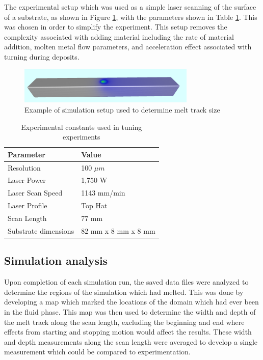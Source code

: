 \documentclass[pdflatex,sn-mathphys]{sn-jnl}
\begin{document}
	The experimental setup which was used as a simple laser scanning of the surface of a substrate, as shown in Figure \ref{fig:melt_validation_example}, with the parameters shown in Table \ref{tab:exp_constants}.  This was chosen in order to simplify the experiment.  This setup removes the complexity associated with adding material including the rate of material addition, molten metal flow parameters, and acceleration effect associated with turning during deposits.
	\begin{figure}[!htb]
		\centering
		\includegraphics[width=0.75\textwidth]{melt_validation_example}
		\caption{Example of simulation setup used to determine melt track size}
		\label{fig:melt_validation_example}
	\end{figure}
	\begin{table}[!htb]
		\centering
		\caption{Experimental constants used in tuning experiments}
		\label{tab:exp_constants}
		\begin{tabular}{|l|l|} \hline
			Parameter & Value \\ \hline
			Resolution & 100 $\mu m$ \\ \hline
			Laser Power & 1,750 W \\ \hline
			Laser Scan Speed & 1143 mm/min \\ \hline
			Laser Profile & Top Hat \\ \hline
			Scan Length & 77 mm \\ \hline
			Substrate dimensions & 82 mm x 8 mm x 8 mm \\ \hline
		\end{tabular}
	\end{table}
	
	
	\subsection{Simulation analysis} \label{sim_analysis}

	Upon completion of each simulation run, the saved data files were analyzed to determine the regions of the simulation which had melted.  This was done by developing a map which marked the locations of the domain which had ever been in the fluid phase.  This map was then used to determine the width and depth of the melt track along the scan length, excluding the beginning and end where effects from starting and stopping motion would affect the results.  These width and depth measurements along the scan length were averaged to develop a single measurement which could be compared to experimentation.  
	
\end{document}
